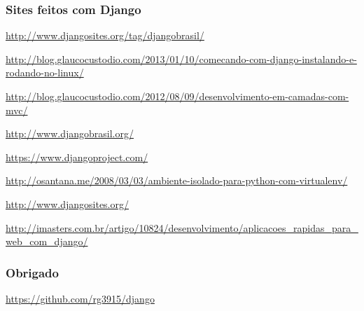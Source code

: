 \documentclass[aspectratio=169]{beamer}
\begin{document}
\begin{frame}\frametitle{Sites feitos com Django}
	\url{http://www.djangosites.org/tag/djangobrasil/}
	
	\url{http://blog.glaucocustodio.com/2013/01/10/comecando-com-django-instalando-e-rodando-no-linux/}
	
	\url{http://blog.glaucocustodio.com/2012/08/09/desenvolvimento-em-camadas-com-mvc/}
	
	\url{http://www.djangobrasil.org/}
	
	\url{https://www.djangoproject.com/}
	
	\url{http://osantana.me/2008/03/03/ambiente-isolado-para-python-com-virtualenv/}
	
	\url{http://www.djangosites.org/}
	
	\url{http://imasters.com.br/artigo/10824/desenvolvimento/aplicacoes\_rapidas\_para\_web\_com\_django/}
\end{frame}

\begin{frame}\frametitle{Obrigado}
	\centering
	\url{https://github.com/rg3915/django}
\end{frame}
\end{document}
